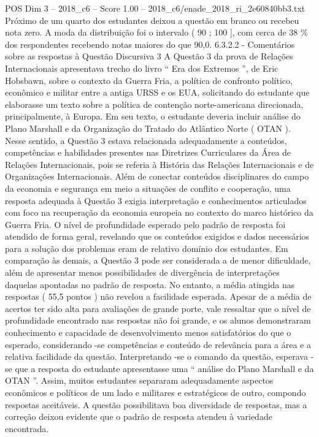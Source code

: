 \begin{textsample}{POS Dim 3 – 2018\_c6 – Score 1.00 – 2018\_c6/enade\_2018\_ri\_2e60840bb3.txt}
Próximo de um quarto dos estudantes deixou a questão em branco ou recebeu nota zero.
A moda da distribuição foi o intervalo ( 90 ; 100 ], com cerca de 38 \% dos respondentes recebendo notas maiores do que 90,0. 6.3.2.2 - Comentários sobre as respostas à Questão Discursiva 3 A Questão 3 da prova de Relações Internacionais apresentava trecho do livro “ Era dos Extremos ”, de Eric Hobsbawn, sobre o contexto da Guerra Fria, a política de confronto político, econômico e militar entre a antiga URSS e os EUA, solicitando do estudante que elaborasse um texto sobre a política de contenção norte-americana direcionada, principalmente, à Europa.
Em seu texto, o estudante deveria incluir análise do Plano Marshall e da Organização do Tratado do Atlântico Norte ( OTAN ).
Nesse sentido, a Questão 3 estava relacionada adequadamente a conteúdos, competências e habilidades presentes nas Diretrizes Curriculares da Área de Relações Internacionais, pois se referia à História das Relações Internacionais e de Organizações Internacionais.
Além de conectar conteúdos disciplinares do campo da economia e segurança em meio a situações de conflito e cooperação, uma resposta adequada à Questão 3 exigia interpretação e conhecimentos articulados com foco na recuperação da economia europeia no contexto do marco histórico da Guerra Fria.
O nível de profundidade esperado pelo padrão de resposta foi atendido de forma geral, revelando que os conteúdos exigidos e dados necessários para a solução dos problemas eram de relativo domínio dos estudantes.
Em comparação às demais, a Questão 3 pode ser considerada a de menor dificuldade, além de apresentar menos possibilidades de divergência de interpretações daquelas apontadas no padrão de resposta.
No entanto, a média atingida nas respostas ( 55,5 pontos ) não revelou a facilidade esperada.
Apesar de a média de acertos ter sido alta para avaliações de grande porte, vale ressaltar que o nível de profundidade encontrado nas respostas não foi grande, e os alunos demonstraram conhecimento e capacidade de desenvolvimento menos satisfatórios do que o esperado, considerando -se competências e conteúdo de relevância para a área e a relativa facilidade da questão.
Interpretando -se o comando da questão, esperava -se que a resposta do estudante apresentasse uma “ análise do Plano Marshall e da OTAN ”.
Assim, muitos estudantes separaram adequadamente aspectos econômicos e políticos de um lado e militares e estratégicos de outro, compondo respostas aceitáveis.
A questão possibilitava boa diversidade de respostas, mas a correção deixou evidente que o padrão de resposta atendeu à variedade encontrada.

\end{textsample}
